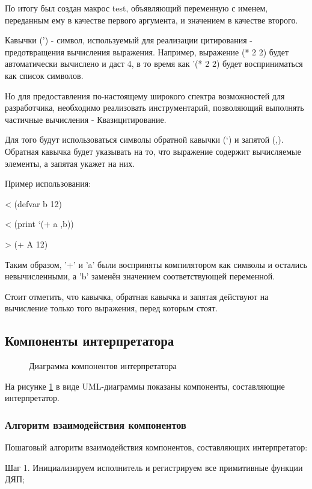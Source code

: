 По итогу был создан макрос test, объявляющий переменную с именем, переданным ему в качестве первого аргумента, и значением в качестве второго.

Кавычки (') - символ, используемый для реализации цитирования - предотвращения вычисления выражения. Например, выражение (* 2 2) будет автоматически вычислено и даст 4, в то время как '(* 2 2) будет восприниматься как список символов.

Но для предоставления по-настоящему широкого спектра возможностей для разработчика, необходимо реализовать инструментарий, позволяющий выполнять частичные вычисления - Квазицитирование.

Для того будут использоваться символы обратной кавычки (`) и запятой (,). Обратная кавычка будет указывать на то, что выражение содержит вычисляемые элементы, а запятая укажет на них.

Пример использования:

< (defvar b 12)

< (print `(+ a ,b))

> (+ A 12)

Таким образом, '+' и 'a' были восприняты компилятором как символы и остались невычисленными, а 'b' заменён значением соответствующей переменной.

Стоит отметить, что кавычка, обратная кавычка и запятая действуют на вычисление только того выражения, перед которым стоят.


\subsection{Компоненты интерпретатора}

\begin{figure}[ht]
	\caption{Диаграмма компонентов интерпретатора}
	\label{kompdiagram:image}
\end{figure}

На рисунке \ref{kompdiagram:image} в виде UML-диаграммы показаны компоненты, составляющие интерпретатор.



\subsubsection{Алгоритм взаимодействия компонентов}
Пошаговый алгоритм взаимодействия компонентов, составляющих интерпретатор:

Шаг 1. Инициализируем исполнитель и регистрируем все примитивные функции ДЯП;

